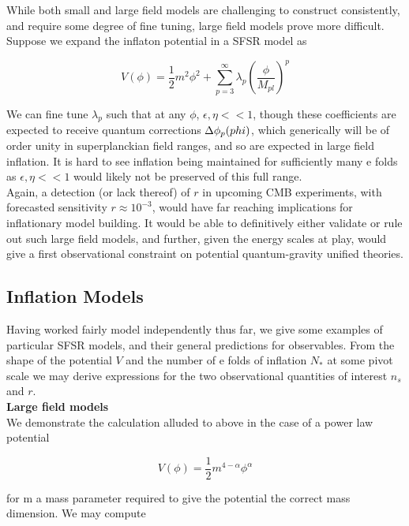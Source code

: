 \documentclass[a4paper,10pt]{article}
\newcommand{\Mp}{M_{pl}}
\newcommand{\half}{\frac{1}{2}}
\begin{document}
While both small and large field models are challenging to construct consistently, and require some degree of fine tuning, large field models prove more difficult. Suppose we expand the inflaton potential in a SFSR model as 

\begin{equation}
V(\phi) = \half m^2\phi^2 + \sum_{p=3}^\infty \lambda_p(\frac{\phi}{\Mp})^p
\end{equation}

We can fine tune $\lambda_p$ such that at any $\phi$, $\epsilon, \eta << 1$, though these coefficients are expected to receive quantum corrections $\Delta\phi_p(\\phi)$, which generically will be of order unity in superplanckian field ranges, and so are expected in large field inflation. It is hard to see inflation being maintained for sufficiently many e folds as $\epsilon, \eta << 1$ would likely not be preserved of this full range. \\

Again, a detection (or lack thereof) of $r$ in upcoming CMB experiments, with forecasted sensitivity $r\approx 10^{-3}$, would have far reaching implications for inflationary model building. It would be able to definitively either validate or rule out such large field models, and further, given the energy scales at play, would give a first observational constraint on potential quantum-gravity unified theories.

\subsection{Inflation Models}

Having worked fairly model independently thus far, we give some examples of particular SFSR models, and their general predictions for observables. From the shape of the potential $V$ and the number of e folds of inflation $N_*$ at some pivot scale we may derive expressions for the two observational quantities of interest $n_s$ and $r$. \\

\textbf{Large field models} \\

We demonstrate the calculation alluded to above in the case of a power law potential

\begin{equation}
V(\phi) = \half m^{4-\alpha}\phi^\alpha
\end{equation}

for m a mass parameter required to give the potential the correct mass dimension. We may compute 
\end{document}
